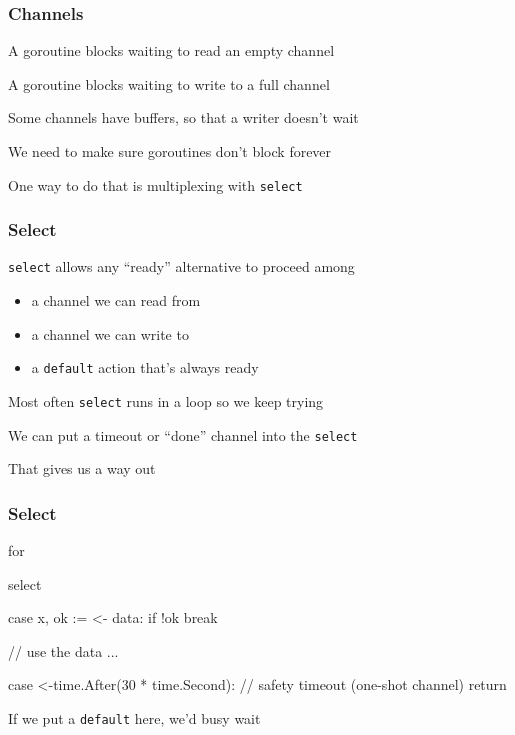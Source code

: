 \documentclass[handout,compress,t,11pt]{beamer}
\begin{document}
\begin{frame}[fragile]
    \frametitle{Channels}
    A goroutine blocks waiting to read an empty channel \par
    \vspace{\baselineskip}
    A goroutine blocks waiting to write to a full channel  \par
    \vspace{2.5\baselineskip}
    Some channels have buffers, so that a writer doesn't wait  \par
    \vspace{3\baselineskip}
    We need to make sure goroutines don't block forever \par
    \vspace{\baselineskip}
    One way to do that is multiplexing with \verb|select|
\end{frame}

\begin{frame}[fragile]
    \frametitle{Select}
    \verb|select| allows any ``ready'' alternative to proceed among
    \begin{itemize}
        \item a channel we can read from
        \item a channel we can write to
        \item a \verb|default| action that's always ready
    \end{itemize}
    \vspace{\baselineskip}
    Most often \verb|select| runs in a loop so we keep trying  \par
    \vspace{2\baselineskip}
    We can put a timeout or ``done'' channel into the \verb|select|  \par
    \vspace{\baselineskip}
    That gives us a way out
\end{frame}

\begin{frame}[fragile]
    \frametitle{Select}
\begin{golang}
for {
	select {
	case x, ok := <- data:
        if !ok {
            break
        }

		// use the data ...

    case <-time.After(30 * time.Second):
        // safety timeout (one-shot channel)
        return
	}
}
\end{golang}
    \vspace{\baselineskip}
If we put a \verb|default| here, we'd busy wait
\end{frame}
\end{document}
